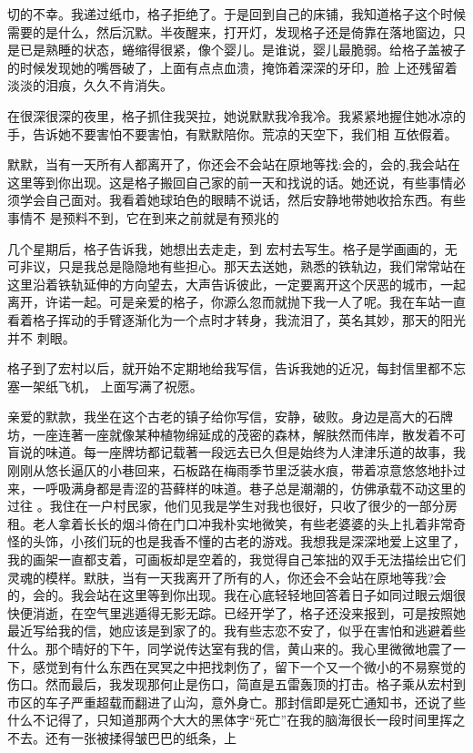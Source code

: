\documentclass{article}
\begin{document}
\newpage
切的不幸。我递过纸巾，格子拒绝了。于是回到自己的床铺，我知道格子这个时候需要的是什么，然后沉默。半夜醒来，打开灯，发现格子还是倚靠在落地窗边，只是已是熟睡的状态，蜷缩得很紧，像个婴儿。是谁说，婴儿最脆弱。给格子盖被子的时候发现她的嘴唇破了，上面有点点血溃，掩饰着深深的牙印，脸
上还残留着淡淡的泪痕，久久不肯消失。 

在很深很深的夜里，格子抓住我哭拉，她说默默我冷我冷。我紧紧地握住她冰凉的手，告诉她不要害怕不要害怕，有默默陪你。荒凉的天空下，我们相
互依假着。 

默默，当有一天所有人都离开了，你还会不会站在原地等找:会的，会的,我会站在这里等到你出现。这是格子搬回自己家的前一天和找说的话。她还说，有些事情必须学会自己面对。我看着她球珀色的眼睛不说话，然后安静地带她收拾东西。有些事情不
是预料不到，它在到来之前就是有预兆的 

几个星期后，格子告诉我，她想出去走走，到
\newpage
宏村去写生。格子是学画画的，无可非议，只是我总是隐隐地有些担心。那天去送她，熟悉的铁轨边，我们常常站在这里沿着铁轨延伸的方向望去，大声告诉彼此，一定要离开这个厌恶的城市，一起离开，许诺一起。可是亲爱的格子，你源么忽而就抛下我一人了呢。我在车站一直看着格子挥动的手臂逐渐化为一个点时才转身，我流泪了，英名其妙，那天的阳光并不
刺眼。 

格子到了宏村以后，就开始不定期地给我写信，告诉我她的近况，每封信里都不忘塞一架纸飞机，
上面写满了祝愿。 

亲爱的默款，我坐在这个古老的镇子给你写信，安静，破败。身边是高大的石牌坊，一座连著一座就像某种植物绵延成的茂密的森林，解肤然而伟岸，散发着不可盲说的味道。每一座牌坊都记载著一段远去已久但是始终为人津津乐道的故事，我刚刚从悠长逼仄的小巷回来，石板路在梅雨季节里泛装水痕，带着凉意悠悠地扑过来，一呼吸满身都是青涩的苔藓样的味道。巷子总是潮潮的，仿佛承载不动这里的过往
\newpage
。我住在一户村民家，他们见我是学生对我也很好，只收了很少的一部分房租。老人拿着长长的烟斗倚在门口冲我朴实地微笑，有些老婆婆的头上扎着非常奇怪的头饰，小孩们玩的也是我香不懂的古老的游戏。我想我是深深地爱上这里了，我的画架一直都支着，可画板却是空着的，我觉得自己笨拙的双手无法描绘出它们灵魂的模样。默肤，当有一天我离开了所有的人，你还会不会站在原地等我?会的，会的。我会站在这里等到你出现。我在心底轻轻地回答着日子如同过眼云烟很快便消逝，在空气里逃遁得无影无踪。已经开学了，格子还没来报到，可是按照她最近写给我的信，她应该是到家了的。我有些志恋不安了，似乎在害怕和逃避着些什么。那个晴好的下午，同学说传达室有我的信，黄山来的。我心里微微地震了一下，感觉到有什么东西在冥冥之中把找刺伤了，留下一个又一个微小的不易察觉的伤口。然而最后，我发现那何止是伤口，简直是五雷轰顶的打击。格子乘从宏村到市区的车子严重超载而翻进了山沟，意外身亡。那封信即是死亡通知书，还说了些什么不记得了，只知道那两个大大的黑体字“死亡”在我的脑海很长一段时间里挥之不去。还有一张被揉得皱巴巴的纸条，上
\newpage
\end{document}
